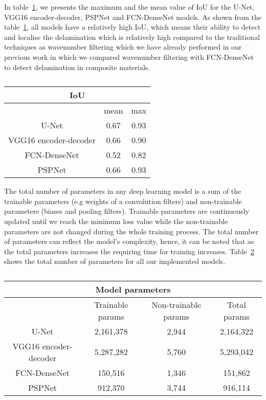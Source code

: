 In table~\ref{tab:table_iou}, we presents the maximum and the mean value of IoU for the U-Net, VGG16 encoder-decoder, PSPNet and FCN-DenseNet models.
As shown from the table~\ref{tab:table_iou}, all models have a relatively high IoU, which means their ability to detect and localise the delamination which is relatively high compared to the traditional techniques as wavenumber filtering which we have already performed in our previous work in which we compared wavenumber filtering with FCN-DenseNet to detect delamination in composite materials.
\begin{table}[]
	\centering
	\caption{}
	\label{tab:table_iou}
	\begin{tabular}{ccc}
		\multicolumn{3}{c}{IoU} \\ \hline
		& mean & max \\ \hline
		U-Net & 0.67 & 0.93 \\ \hline
		VGG16 encoder-decoder & 0.66 & 0.90 \\ \hline
		FCN-DenseNet & 0.52 & 0.82 \\ \hline
		PSPNet & 0.66 & 0.93 \\ \hline
	\end{tabular}
\end{table}

The total number of parameters in any deep learning model is a sum of the trainable parameters (e.g weights of a convolution filters) and non-trainable parameters (biases and  pooling filters).
Trainable parameters are continuously updated until we reach the minimum loss value while the non-trainable parameters are not changed during the whole training process.
The total number of parameters can reflect the model's complexity, hence, it can be noted that as the total parameters increases the requiring time for training increases.
Table~\ref{tab:table_parameters} shows the total number of parameters for all our implemented models.
\begin{table}[]
	\centering
	\caption{}
	\label{tab:table_parameters}
	\resizebox{\textwidth}{!}
	{
		\begin{tabular}{cccc}
			\multicolumn{4}{c}{Model parameters} \\ \hline
			& Trainable params & Non-trainable params & Total params \\ \hline
			U-Net & 2,161,378 & 2,944 & 2,164,322 \\ \hline
			VGG16 encoder-decoder & 5,287,282 & 5,760 & 5,293,042 \\ \hline
			FCN-DenseNet & 150,516 & 1,346 & 151,862 \\ \hline
			PSPNet & 912,370 & 3,744 & 916,114 \\ \hline
		\end{tabular}
	}
\end{table}

